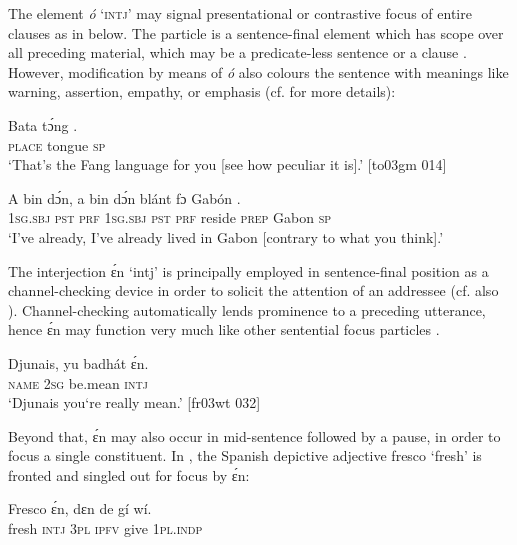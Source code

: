 The element \textit{ó} ‘\textsc{intj}’ may signal presentational or contrastive focus of entire clauses as in  below. The particle is a sentence-final element which has scope over all preceding material, which may be a predicate-less sentence  or a clause . However, modification by means of \textit{ó} also colours the sentence with meanings like warning, assertion, empathy, or emphasis (cf.  for more details): 


\ea%
    \label{ex:key:669}
    \gll Bata    tɔ́ng    .\\
\textsc{place}  tongue  \textsc{sp}\\

\glt ‘That’s the Fang language for you [see how peculiar it is].’ [to03gm 014]
\z


\ea%
    \label{ex:key:670}
    \gll \MakeUppercase{A}   bin  dɔ́n,    a    bin  dɔ́n    blánt  fɔ  Gabón  .\\
\textsc{1sg.sbj}  \textsc{pst}  \textsc{prf}    \textsc{1sg.sbj}  \textsc{pst}  \textsc{prf}    reside  \textsc{prep}  Gabon  \textsc{sp}\\

\glt ‘I’ve already, I’ve already lived in Gabon [contrary to what you think].’ 


\glt [ma03hm 035]
\z

The interjection ɛ́n ‘intj’ is principally employed in sentence-final position as a channel-checking device in order to solicit the attention of an addressee (cf. also ). Channel-checking automatically lends prominence to a preceding utterance, hence ɛ́n may function very much like other sentential focus particles . 


\ea%
    \label{ex:key:671}
    \gll Djunais,  yu  badhát  ɛ́n.\\
\textsc{name}  \textsc{2sg}  be.mean  \textsc{intj}\\

\glt ‘Djunais you‘re really mean.’ [fr03wt 032]
\z

Beyond that, ɛ́n may also occur in mid-sentence followed by a pause, in order to focus a single constituent. In , the Spanish depictive adjective fresco ‘fresh’ is fronted and singled out for focus by ɛ́n:


\ea%
    \label{ex:key:672}
    \gll Fresco  ɛ́n,  dɛn  de  gí  wí.\\
fresh  \textsc{intj}  \textsc{3pl}  \textsc{ipfv}  give  \textsc{1pl.indp}\\

